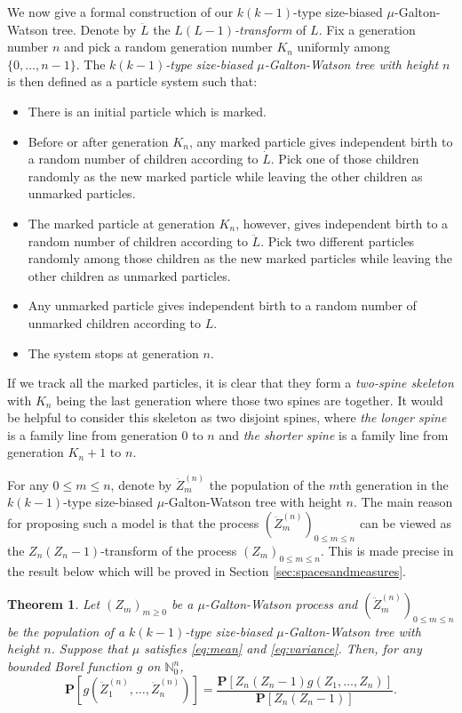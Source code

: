 \documentclass[12pt,a4paper]{amsart}
\newtheorem{thm}{Theorem}[section]
\numberwithin{equation}{section}
\begin{document}
	We now give a formal construction of our $k(k-1)$-type size-biased $\mu$-Galton-Watson tree.
	Denote by $\ddot L$ the \emph{$L(L-1)$-transform} of $L$.
	Fix a generation number $n$ and pick a random generation number $K_n$ uniformly among $\{0,\dots,n-1\}$.
	The \emph{$k(k-1)$-type size-biased $\mu$-Galton-Watson tree with height $n$} is then defined as a particle system such that:
\begin{itemize}
\item
	There is an initial particle which is marked.
\item
	Before or after generation $K_n$, any marked particle gives independent birth to a random number of children according to $\dot L$.
	Pick one of those children randomly as the new marked particle while leaving the other children as unmarked particles.
\item
	The marked particle at generation $K_n$, however, gives independent birth to a random number of children according to $\ddot L$.
	Pick two different particles randomly among those children as the new marked particles while leaving the other children as unmarked particles.
\item
	Any unmarked particle gives independent birth to a random number of unmarked children according to $L$.
\item
	The system stops at generation $n$.
\end{itemize}

	If we track all the marked particles, it is clear that they form a \emph{two-spine skeleton} with $K_n$ being the last generation where those two spines are together.
	It would be helpful to consider this skeleton as two disjoint spines, 
	where \emph{the longer spine} is a family line from generation $0$ to $n$ and \emph{the shorter spine} is a family line from generation $K_n+1$ to $n$.
	
	For any $0\le m \le n$, denote by $\ddot Z_m^{(n)}$ the population of the $m$th generation in the $k(k-1)$-type size-biased $\mu$-Galton-Watson tree with height $n$.
	The main reason for proposing such a model is that the process $(\ddot Z_m^{(n)})_{0\le m\le n}$ can be viewed as the $Z_n(Z_n-1)$-transform of the process $(Z_m)_{0\le m\le n}$.
	This is made precise in the result below which will be proved in Section \ref{sec:spacesandmeasures}.
\begin{thm}
\label{thm: change of measure}
	Let $(Z_m)_{m\ge 0}$ be a $\mu$-Galton-Watson process and $(\ddot Z_m^{(n)})_{0\le m\le n}$ be the population of a $k(k-1)$-type size-biased $\mu$-Galton-Watson tree with height $n$.
	Suppose that $\mu$ satisfies \eqref{eq:mean} and \eqref{eq:variance}.
	Then, for any bounded Borel function $g$ on $\mathbb N^{n}_0$,
\begin{equation*}
		\mathbf P[ g ( \ddot Z_1^{(n)}, \dots, \ddot Z_n^{(n)})]
	=
		\frac{ \mathbf P[ Z_n(Z_n-1) g( Z_1, \dots, Z_n)]} {\mathbf P [ Z_n ( Z_n - 1)]}.			
\end{equation*}
\end{thm}
\end{document}
